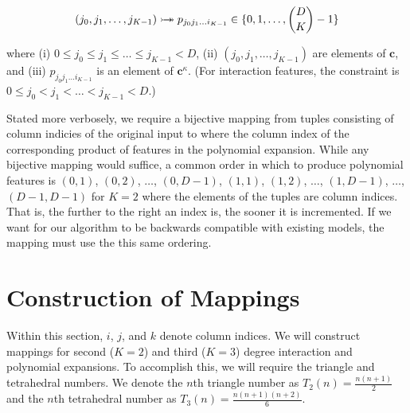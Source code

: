 \documentclass[journal]{journal}
\begin{document}
\begin{equation}
(j_0, j_1, \dots, j_{K-1}) \rightarrowtail \hspace{-1.9ex} \twoheadrightarrow p_{j_0j_1 \dots i_{K-1}} \in \{0,1,\dots,\binom{D}{K}-1\} 
\end{equation}

where (i) $ 0 \le j_0 \le j_1 \le \dots \le j_{K-1} < D$, (ii) $(j_0, j_1, \dots, j_{K-1})$ are elements of $\bm{c}$, and (iii) $p_{j_0j_1 \dots i_{K-1}}$ is an element of $\bm{c}^\kappa$. (For interaction features, the constraint is $ 0 \le j_0 < j_1 < \dots < j_{K-1} < D$.)

Stated more verbosely, we require a bijective mapping from tuples consisting of column indicies of the original input to where the column index of the corresponding product of features in the polynomial expansion.
While any bijective mapping would suffice, a common order in which to produce polynomial features is $(0, 1)$, $(0, 2)$, $\dots$, $(0, D-1)$, $(1, 1)$, $(1, 2)$, $\dots$, $(1, D-1)$, $\dots$, $(D-1, D-1)$ for $K=2$ where the elements of the tuples are column indices.
That is, the further to the right an index is, the sooner it is incremented.
If we want for our algorithm to be backwards compatible with existing models, the mapping must use the this same ordering.


\section{Construction of Mappings}

Within this section, $i$, $j$, and $k$ denote column indices.
We will construct mappings for second ($K=2$) and third ($K=3$) degree interaction and polynomial expansions.
To accomplish this, we will require the triangle and tetrahedral numbers.
We denote the $n$th triangle number as $T_2(n) = \frac{n(n+1)}{2}$ and the $n$th tetrahedral number as $T_3(n) = \frac{n(n+1)(n+2)}{6}$.
\end{document}
